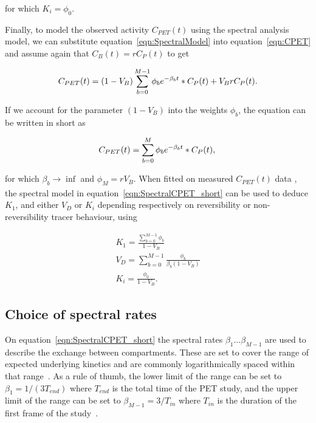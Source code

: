 for which $K_i = {\phi_0}$. 

Finally, to model the observed activity $C_{PET}(t)$ using the spectral analysis model, we can substitute equation~\ref{eqn:SpectralModel} into equation~\ref{eqn:CPET} and assume again that $C_{B}(t) = r C_{P}(t)$ to get

\begin{equation} 
{C_{PET}}(t)  = (1-V_{B}) \sum_{b=0}^{M-1} {\phi_b}  e^{-\beta_b t} \ast C_P(t) + V_{B} r C_P(t)   \\ . \\
\label{eqn:SpectralCPET}
\end{equation}

If we account for the parameter $(1-V_{B})$ into the weights $\phi_b$, the equation can be written in short as 

\begin{equation} 
{C_{PET}}(t)  = \sum_{b=0}^{M} {\phi_b} e^{-\beta_b t} \ast C_P(t)   \\ , \\
\label{eqn:SpectralCPET_short}
\end{equation}

for which $\beta_b \xrightarrow[]{}\inf$ and $\phi_M = r V_{B}$. 
When fitted on measured ${C_{PET}}(t)$ data , the spectral model in equation~\ref{eqn:SpectralCPET_short} can be used to deduce $K_1$, and either $V_D$ or $K_i$ depending respectively on reversibility or non-reversibility tracer behaviour, using

\begin{subequations}
\label{eqn:AllSpectralEqns}
\begin{align}
K_1 = \frac{\sum_{b=0}^{M-1} {\phi_b}}{1-{V_{B}}}   \\  
V_D = \sum_{b=0}^{M-1} \frac {\phi_b}{\beta_b (1-V_{B})} \\
K_i = \frac{\phi_0}{1-V_{B}} .
\end{align}
\label{eqn:SpectralCPET_AllEquations}
\end{subequations}

\subsection{Choice of spectral rates}

On equation~\ref{eqn:SpectralCPET_short} the spectral rates $\beta_1 ... \beta_{M-1}$ are used to describe the exchange between compartments. These are set to cover the range of expected underlying kinetics and are commonly logarithmically spaced within that range~\cite{Gunn2002}.
As a rule of thumb, the lower limit of the range can be set to $\beta_1 = 1/(3 T_{end})$ where $T_{end}$ is the total time of the PET study, and the upper limit of the range can be set to $\beta_{M-1} = 3/T_{in}$ where $T_{in}$ is the duration of the first frame of the study~\cite{Veronese2016}.

